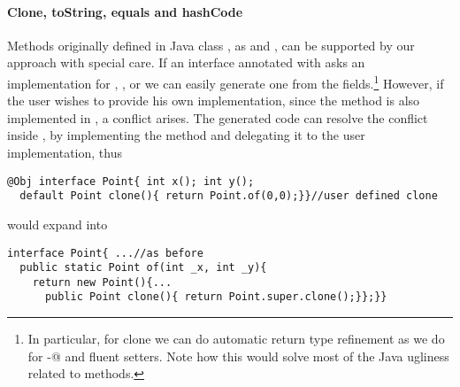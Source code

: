\begin{comment}
\subsection{Class Invariants in ClassLess Java}
Since objects are created by automatically generated methods, another limitation
of our current approach is that there is no place where the user can dynamically
check for class invariants. In Java often we see code like
\begin{lstlisting}
class Point{ int x; int y;
  Point(int x; int y){this.x=x;this.y=y; assert this.checkInvariant();}
  private boolean checkInvariant(){... x>0,y>0...}
}
\end{lstlisting} 

We are considering an extension of our annotation where 
default methods with the special name \Q@checkInvariant()@ will be called inside the \Q@of@ methods.
If multiple interfaces are implemented, and more then one offers
\Q@checkInvariant()@,  a composed implementation could be automatically generated, composing by \Q@&&@ the various competing implementations.
\end{comment}

\paragraph{Clone, toString, equals and hashCode}
Methods originally defined in Java class \Q@Object@, as \Q@clone@ and
\Q@toString@, can be supported by our approach with special care. If an
interface annotated with \mixin asks an implementation for \Q@clone@,
\Q@toString@, \Q@equals@ or \Q@hashCode@ we can easily generate one from the
fields.\footnote{In particular, for clone we can do automatic return type
  refinement as we do for \Q@with-@ and fluent setters. Note how this would
  solve most of the Java ugliness related to \Q@clone@ methods.}  However, if
the user wishes to provide his own implementation, since the method is also
implemented in \Q@Object@, a conflict arises. The generated code can resolve the
conflict inside \Q@of@, by implementing the method and delegating it to the user
implementation, thus

\begin{lstlisting}
@Obj interface Point{ int x(); int y();
  default Point clone(){ return Point.of(0,0);}}//user defined clone
\end{lstlisting} 
would expand into 

\begin{lstlisting}
interface Point{ ...//as before
  public static Point of(int _x, int _y){
    return new Point(){...
      public Point clone(){ return Point.super.clone();}};}}
\end{lstlisting} 
